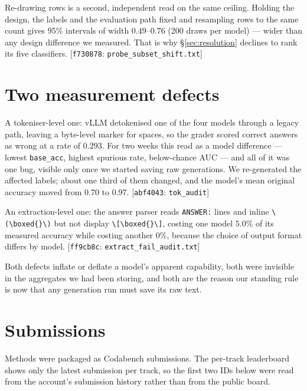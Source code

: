 \documentclass[10pt]{article}
\newcommand{\cmt}[2]{{\footnotesize\textsf{[}\texttt{#1}\textsf{:} #2\textsf{]}}}
\begin{document}
Re-drawing rows is a second, independent read on the same ceiling. Holding the design, the labels
and the evaluation path fixed and resampling rows to the same count gives 95\% intervals of width
$0.49$--$0.76$ (200 draws per model) --- wider than any design difference we measured. That is why
\S\ref{sec:resolution} declines to rank its five classifiers.
\cmt{f730878}{\texttt{probe\_subset\_shift.txt}}

\section{Two measurement defects}
\label{app:defects}
A tokeniser-level one: vLLM detokenised one of the four models through a legacy path, leaving a
byte-level marker for spaces, so the grader scored correct answers as wrong at a rate of $0.293$.
For two weeks this read as a model difference --- lowest \texttt{base\_acc}, highest spurious rate,
below-chance AUC --- and all of it was one bug, visible only once we started saving raw generations.
We re-generated the affected labels; about one third of them changed, and the model's mean original
accuracy moved from $0.70$ to $0.97$. \cmt{abf4043}{\texttt{tok\_audit}}

An extraction-level one: the answer parser reads \texttt{ANSWER:} lines and inline
\texttt{\textbackslash(\textbackslash boxed\{\}\textbackslash)} but not display
\texttt{\textbackslash[\textbackslash boxed\{\}\textbackslash]}, costing one model $5.0\%$ of its
measured accuracy while costing another $0\%$, because the choice of output format differs by model.
\cmt{ff9cb8c}{\texttt{extract\_fail\_audit.txt}}

Both defects inflate or deflate a model's apparent capability, both were invisible in the aggregates
we had been storing, and both are the reason our standing rule is now that any generation run must
save its raw text.

\section{Submissions}
\label{app:subs}
Methods were packaged as Codabench submissions. The per-track leaderboard shows only the latest
submission per track, so the first two IDs below were read from the account's submission history
rather than from the public board.
\end{document}
